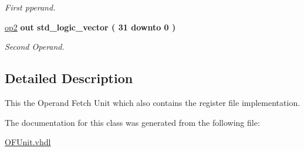 \begin{DoxyCompactItemize}
\begin{DoxyCompactList}\small\item\em First pperand. \end{DoxyCompactList}\item 
\hypertarget{class_o_f_unit_a014e99b0b5a371c08961e8a6b658d3f4}{\hyperlink{class_o_f_unit_a014e99b0b5a371c08961e8a6b658d3f4}{op2}  {\bfseries {\bfseries \textcolor{vhdlkeyword}{out}\textcolor{vhdlchar}{ }}} {\bfseries \textcolor{comment}{std\-\_\-logic\-\_\-vector}\textcolor{vhdlchar}{ }\textcolor{vhdlchar}{(}\textcolor{vhdlchar}{ } \textcolor{vhdldigit}{31} \textcolor{vhdlchar}{ }\textcolor{vhdlchar}{ }\textcolor{vhdlchar}{ }\textcolor{vhdlkeyword}{downto}\textcolor{vhdlchar}{ }\textcolor{vhdlchar}{ }\textcolor{vhdlchar}{ } \textcolor{vhdldigit}{0} \textcolor{vhdlchar}{ }\textcolor{vhdlchar}{)}\textcolor{vhdlchar}{ }} }\label{class_o_f_unit_a014e99b0b5a371c08961e8a6b658d3f4}

\begin{DoxyCompactList}\small\item\em Second Operand. \end{DoxyCompactList}\end{DoxyCompactItemize}


\subsection{Detailed Description}
This the Operand Fetch Unit which also contains the register file implementation. 

The documentation for this class was generated from the following file\-:\begin{DoxyCompactItemize}
\item 
\hyperlink{_o_f_unit_8vhdl}{O\-F\-Unit.\-vhdl}\end{DoxyCompactItemize}
